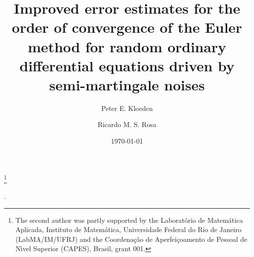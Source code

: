 \documentclass[reqno,12pt]{amsart}
\theoremstyle{plain} %
\theoremstyle{definition} %
\begin{document}


\title[Convergence of Euler method for Random ODEs with semi-martingales]{Improved error estimates for the order of convergence of the Euler method for random ordinary differential equations driven by semi-martingale noises}

\author[P. E. Kloeden]{Peter E. Kloeden}
\author[R. M. S. Rosa]{Ricardo M. S. Rosa}

\address[Peter E. Kloeden]{Mathematics Department, University of T\"ubingen, Germany}
\address[Ricardo M. S. Rosa]{Instituto de Matem\'atica, Universidade Federal do Rio de Janeiro, Brazil}


\date{\today}

\thanks{The second author was partly supported by the Laborat\'orio de Matem\'atica Aplicada, Instituto de Matem\'atica, Universidade Federal do Rio de Janeiro (LabMA/IM/UFRJ) and the Coordena\c{c}\~ao de Aperfei\c{c}oamento de Pessoal de N\'\i vel Superior (CAPES), Brasil, grant 001.}

\makeatletter
{}
\makeatother
{}

.
\end{document}

